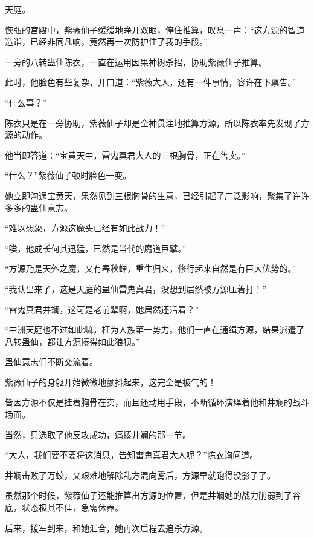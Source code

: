 
\begin{this_body}



天庭。

恢弘的宫殿中，紫薇仙子缓缓地睁开双眼，停住推算，叹息一声：“这方源的智道造诣，已经非同凡响，竟然再一次防护住了我的手段。”

一旁的八转蛊仙陈衣，一直在运用因果神树杀招，协助紫薇仙子推算。

此时，他脸色有些复杂，开口道：“紫薇大人，还有一件事情，容许在下禀告。”

“什么事？”

陈衣只是在一旁协助，紫薇仙子却是全神贯注地推算方源，所以陈衣率先发现了方源的动作。

他当即答道：“宝黄天中，雷鬼真君大人的三根胸骨，正在售卖。”

“什么？”紫薇仙子顿时脸色一变。

她立即沟通宝黄天，果然见到三根胸骨的生意，已经引起了广泛影响，聚集了许许多多的蛊仙意志。

“难以想象，方源这魔头已经有如此战力！”

“唉，他成长何其迅猛，已然是当代的魔道巨擘。”

“方源乃是天外之魔，又有春秋蝉，重生归来，修行起来自然是有巨大优势的。”

“我认出来了，这是天庭的蛊仙雷鬼真君，没想到居然被方源压着打！”

“雷鬼真君井斓，这可是老前辈啊，她居然还活着？”

“中洲天庭也不过如此嘛，枉为人族第一势力。他们一直在通缉方源，结果派遣了八转蛊仙，都让方源揍得如此狼狈。”

蛊仙意志们不断交流着。

紫薇仙子的身躯开始微微地颤抖起来，这完全是被气的！

皆因方源不仅是挂着胸骨在卖，而且还动用手段，不断循环演绎着他和井斓的战斗场面。

当然，只选取了他反攻成功，痛揍井斓的那一节。

“大人，我们要不要将这消息，告知雷鬼真君大人呢？”陈衣询问道。

井斓击败了万蛟，又艰难地解除乱方混向雾后，方源早就跑得没影子了。

虽然那个时候，紫薇仙子还能推算出方源的位置，但是井斓她的战力削弱到了谷底，状态极其不佳，急需休养。

后来，援军到来，和她汇合，她再次启程去追杀方源。


\end{this_body}

